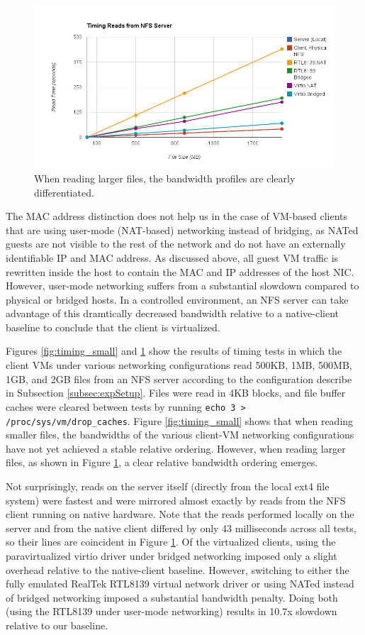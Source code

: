 \documentclass[letterpaper,twocolumn,11pt]{article}
\begin{document}
\begin{figure}[htb]
		\includegraphics[scale=0.3]{timing_large.png}
	\caption{When reading larger files, the bandwidth profiles are clearly differentiated.}
	\label{fig:timing_large}
\end{figure}

The MAC address distinction does not help us in the case of VM-based clients that are using user-mode (NAT-based) networking instead of bridging, as NATed guests are not visible to the rest of the network and do not have an externally identifiable IP and MAC address. As discussed above, all guest VM traffic is rewritten inside the host to contain the MAC and IP addresses of the host NIC. However, user-mode networking suffers from a substantial slowdown compared to physical or bridged hosts. In a controlled environment, an NFS server can take advantage of this dramtically decreased bandwidth relative to a native-client baseline to conclude that the client is virtualized. 

Figures \ref{fig:timing_small} and \ref{fig:timing_large} show the results of timing tests in which the client VMs under various networking configurations read 500KB, 1MB, 500MB, 1GB, and 2GB files from an NFS server according to the configuration describe in Subsection \ref{subsec:expSetup}. Files were read in 4KB blocks, and file buffer caches were cleared between tests by running \texttt{echo 3 > /proc/sys/vm/drop\_caches}. Figure \ref{fig:timing_small} shows that when reading smaller files, the bandwidths of the various client-VM networking configurations have not yet achieved a stable relative ordering. However, when reading larger files, as shown in Figure \ref{fig:timing_large}, a clear relative bandwidth ordering emerges.

Not surprisingly, reads on the server itself (directly from the local ext4 file system) were fastest and were mirrored almost exactly by reads from the NFS client running on native hardware. Note that the reads performed locally on the server and from the native client differed by only 43 milliseconds across all tests, so their lines are coincident in Figure \ref{fig:timing_large}. Of the virtualized clients, using the paravirtualized virtio driver under bridged networking imposed only a slight overhead relative to the native-client baseline. However, switching to either the fully emulated RealTek RTL8139 virtual network driver or using NATed instead of bridged networking imposed a substantial bandwidth penalty. Doing both (using the RTL8139 under user-mode networking) results in 10.7x slowdown relative to our baseline. 
\end{document}

